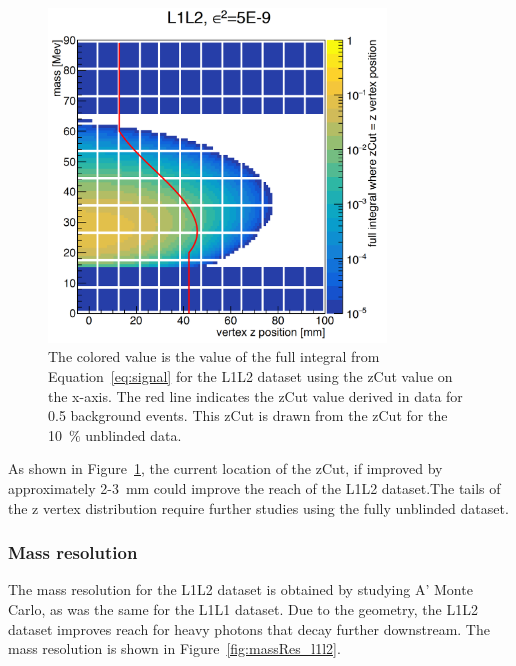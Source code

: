 \documentclass[twoside]{article}
\begin{document}
\begin{figure}[H]
  \centering
      \includegraphics[width=0.8\textwidth]{plots/L1L2_effmz.png}
  \caption{The colored value is the value of the full integral from Equation~\eqref{eq:signal} for the L1L2 dataset using the zCut value on the x-axis. The red line indicates the zCut value derived in data for 0.5 background events. This zCut is drawn from the zCut for the 10~$\%$ unblinded data.}
  \label{fig:integratedVal2D_l1l2}
\end{figure} 

As shown in Figure~\ref{fig:integratedVal2D_l1l2}, the current location of the zCut, if improved by approximately 2-3~mm could improve the reach of the L1L2 dataset.The tails of the z vertex distribution require further studies using the fully unblinded dataset. 


\subsubsection{Mass resolution}

The mass resolution for the L1L2 dataset is obtained by studying A' Monte Carlo, as was the same for the L1L1 dataset. Due to the geometry, the L1L2 dataset improves reach for heavy photons that decay further downstream. The mass resolution is shown in Figure~\ref{fig:massRes_l1l2}.
\end{document}
